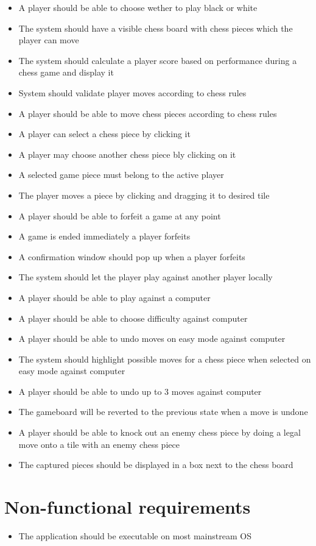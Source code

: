 \documentclass[letterpaper,11pt]{article}
\begin{document}
\begin{itemize}
	\item A player should be able to choose wether to play black or white
	\item The system should have a visible chess board with chess pieces which the player can move
	\item The system should calculate a player score based on performance during a chess game and display it
	\item System should validate player moves according to chess rules
	\item A player should be able to move chess pieces according to chess rules
	\item A player can select a chess piece by clicking it
	\item A player may choose another chess piece bly clicking on it
	\item A selected game piece must belong to the active player
	\item The player moves a piece by clicking and dragging it to desired tile
	\item A player should be able to forfeit a game at any point
	\item A game is ended immediately a player forfeits
	\item A confirmation window should pop up when a player forfeits
	\item The system should let the player play against another player locally
	\item A player should be able to play against a computer
	\item A player should be able to choose difficulty against computer
	\item A player should be able to undo moves on easy mode against computer
	\item The system should highlight possible moves for a chess piece when selected on easy mode against computer
	\item A player should be able to undo up to 3 moves against computer
	\item The gameboard will be reverted to the previous state when a move is undone
	\item A player should be able to knock out an enemy chess piece by doing a legal move onto a tile with an enemy chess piece
	\item The captured pieces should be displayed in a box next to the chess board
\end{itemize}

\section*{Non-functional requirements}
\begin{itemize}
	\item The application should be executable on most mainstream OS
\end{itemize}
\end{document}
